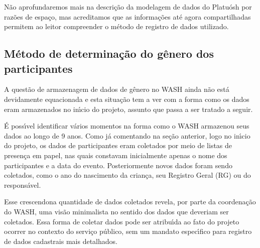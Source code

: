 \documentclass[
12pt,		%
openright,	%
twoside,  %
a4paper,			%
chapter=TITLE,		%
english,			%
french,				%
spanish,			%
brazil				%
]{USPSC-classe/USPSC}
\begin{document}
N\~ao aprofundaremos mais na descri\c{c}\~ao da modelagem de dados do Platu\'osh por raz\~oes de espa\c{c}o, mas acreditamos que as informa\c{c}\~oes at\'e agora compartilhadas permitem ao leitor compreender o m\'etodo de registro de dados utilizado.














\subsection[M\'etodo de determina\c{c}\~ao do g\^enero dos participantes]{M\'etodo de determina\c{c}\~ao do g\^enero dos participantes}\label{M\'etodo de determina\c{c}\~ao do g\^enero dos participantes}
A quest\~ao de armazenagem de dados de g\^enero no WASH ainda n\~ao est\'a devidamente equacionada e esta situa\c{c}\~ao tem a ver com a forma como os dados eram armazenados no in\'{\i}cio do projeto, assunto que passa a ser tratado a seguir.














\'E poss\'{\i}vel identificar v\'arios momentos na forma como o WASH armazenou seus dados ao longo de 9 anos. Como j\'a comentando na se\c{c}\~ao anterior, logo no in\'{\i}cio do projeto, os dados de participantes eram coletados por meio de listas de presen\c{c}a em papel, nas quais constavam inicialmente apenas o nome dos participantes e a data do evento. Posteriormente novos dados foram sendo coletados, como o ano do nascimento da crian\c{c}a, seu Registro Geral (RG) ou do respons\'avel.














Esse \textquotedbl crescendo\textquotedbl  na quantidade de dados coletados revela, por parte da coordena\c{c}\~ao do WASH, uma vis\~ao minimalista no sentido dos dados que deveriam ser coletados. Essa forma de coletar dados pode ser atribu\'{\i}da ao fato do projeto ocorrer no contexto do servi\c{c}o p\'ublico, sem um mandato espec\'{\i}fico para registro de dados cadastrais mais detalhados.
\end{document}
